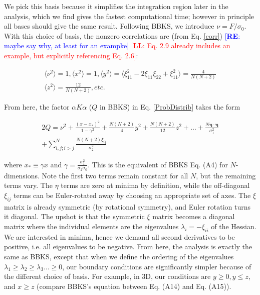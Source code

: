 \documentclass[12pt]{article}
\newcommand{\re}[1]{\textcolor{blue}{[{\bf RE}: #1]}}
\newcommand{\lfl}[1]{\textcolor{red}{[{\bf LL}: #1]}}
\begin{document}
We pick this basis because it simplifies the integration region later in the analysis, which we find gives the fastest computational time; however in principle all bases should give the same result. Following BBKS, we introduce $\nu = F/\sigma_0$. With this choice of basis, the nonzero correlations are (from Eq. \ref{corr}) \re{maybe say why, at least for an exampke} \lfl{Eq. 2.9 already includes an example, but explicitly referencing Eq. 2.6}:

\begin{gather}
\langle\nu^2\rangle = 1, \langle x^2\rangle=1, \langle y^2 \rangle = \langle \xi_{11}^2 -2\xi_{11}\xi_{22} + \xi_{11}^2\rangle = \frac{4}{N(N+2)} \\
\langle z^2 \rangle = \frac{12}{N(N+2)}, etc.
\end{gather}

From here, the factor $\alpha K \alpha$ ($Q$ in BBKS) in Eq. \ref{ProbDistrib} takes the form

\begin{equation} \label{Q}
\begin{split}
2Q = \nu^2 + \frac{(x-x_*)^2}{1-\gamma^2} + \frac{N(N+2)}{4}y^2 + \frac{N(N+2)}{12}z^2 + \ldots + \frac{N \pmb{\eta}\cdot \pmb{\eta}}{\sigma_1^2} \\
+ \sum_{i,j;i > j}^N\frac{N(N+2)\xi_{ij}}{\sigma_2^2}
\end{split}
\end{equation}

\noindent where $x_* \equiv \gamma x$ and $\gamma = \frac{\sigma_1^2}{\sigma_2 \sigma_0}$. This is the equivalent of BBKS Eq. (A4) for $N$-dimensions. Note the first two terms remain constant for all $N$, but the remaining terms vary. The $\eta$ terms are zero at minima by definition, while the off-diagonal $\xi_{ij}$ terms can be Euler-rotated away by choosing an appropriate set of axes. The $\xi$ matrix is already symmetric (by rotational symmetry), and Euler rotation turns it diagonal.\cite{Goldstein} The upshot is that the symmetric $\xi$ matrix becomes a diagonal matrix where the individual elements are the eigenvalues $\lambda_i = -\xi_{ii}$ of the Hessian. We are interested in minima, hence we demand all second derivatives to be positive, i.e. all eigenvalues to be negative. From here, the analysis is exactly the same as BBKS, except that when we define the ordering of the eigenvalues $\lambda_1 \geq \lambda_2 \geq \lambda_3 \ldots \geq 0$, our boundary conditions are significantly simpler because of the different choice of basis. For example, in 3D, our conditions are $y \geq 0, y \leq z$, and $x \geq z$ (compare BBKS's equation between Eq. (A14) and Eq. (A15)).
\end{document}
